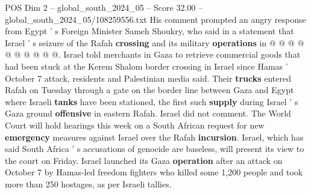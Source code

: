 \begin{textsample}{POS Dim 2 – global\_south\_2024\_05 – Score 32.00 – global\_south\_2024\_05/108259556.txt}
His comment prompted an angry response from Egypt ' s Foreign Minister Sameh Shoukry, who said in a statement that Israel ' s seizure of the Rafah \textbf{crossing} and its military \textbf{operations} in @ @ @ @ @ @ @ @ @ @.
Israel told merchants in Gaza to retrieve commercial goods that had been stuck at the Kerem Shalom border crossing in Israel since Hamas ' October 7 attack, residents and Palestinian media said.
Their \textbf{trucks} entered Rafah on Tuesday through a gate on the border line between Gaza and Egypt where Israeli \textbf{tanks} have been stationed, the first such \textbf{supply} during Israel ' s Gaza ground \textbf{offensive} in eastern Rafah.
Israel did not comment.
The World Court will hold hearings this week on a South African request for new \textbf{emergency} measures against Israel over the Rafah \textbf{incursion}.
Israel, which has said South Africa ' s accusations of genocide are baseless, will present its view to the court on Friday.
Israel launched its Gaza \textbf{operation} after an attack on October 7 by Hamas-led freedom fighters who killed some 1,200 people and took more than 250 hostages, as per Israeli tallies.

\end{textsample}
